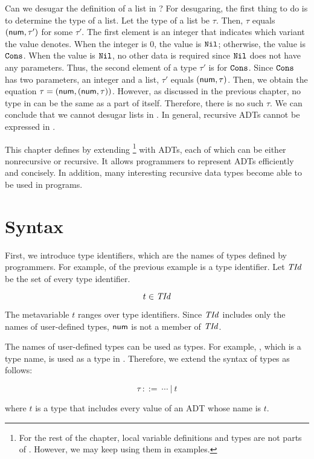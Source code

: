 Can we desugar the definition of a list in \plang? For desugaring, the first
thing to do is to determine the type of a list. Let the type of a list be
$\tau$. Then, $\tau$ equals $(\textsf{num}, \tau')$ for some $\tau'$. The first element is an integer that
indicates which variant the value denotes. When the integer is $0$, the value is
$\texttt{Nil}$; otherwise, the value is $\texttt{Cons}$. When the value is
$\texttt{Nil}$, no other data is required since $\texttt{Nil}$ does not have any
parameters. Thus, the second element of a type $\tau'$ is for $\texttt{Cons}$. Since
$\texttt{Cons}$ has two parameters, an integer and a list, $\tau'$ equals
$(\textsf{num},\tau)$. Then, we obtain the equation $\tau=(\textsf{num},(\textsf{num},\tau))$.
However, as discussed in the previous chapter, no type in \plang can be the same
as a part of itself. Therefore, there is no such $\tau$. We can conclude that we
cannot desugar lists in \plang. In general, recursive ADTs cannot be expressed
in \plang.

This chapter defines \Lang by extending \plang\footnote{For the rest of the
chapter, local variable definitions and types are not parts of \plang. However,
we may keep using them in examples.} with ADTs, each of which can be
either nonrecursive or recursive. It allows programmers to represent ADTs
efficiently and concisely. In addition, many interesting recursive data types
become able to be used in programs.

\section{Syntax}

First, we introduce type identifiers, which are the names of types defined by
programmers. For example,
 of the previous example is a type identifier. Let $\mbox{\emph{TId}}$ be
the set of every type identifier.

\[ t \in \mbox{\emph{TId}} \]

The metavariable $t$ ranges over type identifiers. Since $\mbox{\emph{TId}}$ includes only
the names of user-defined types, $\textsf{num}$ is not a member of $\mbox{\emph{TId}}$.

The names of user-defined types can be used as types. For example, ,
which is a type name, is used as a type in .
Therefore, we extend the syntax of types as follows:

\[ \tau \ ::= \ \cdots\ |\  t \]

where $t$ is a type that includes every value of an ADT whose name is $t$.

